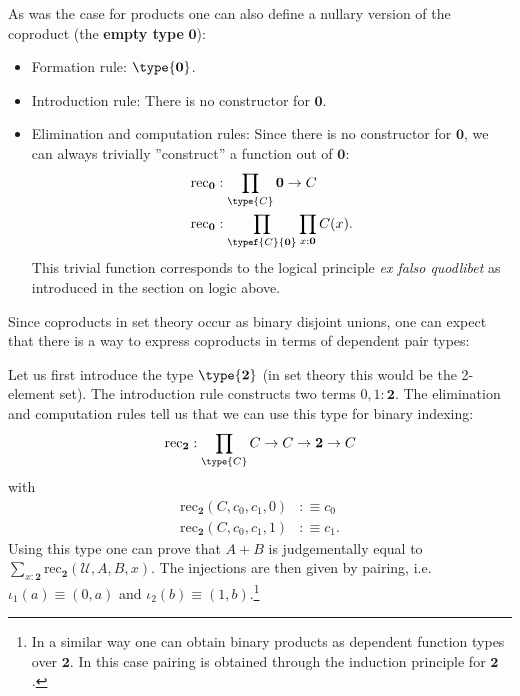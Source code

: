 {        As was the case for products one can also define a nullary version of the coproduct (the \textbf{empty type} $\mathbf{0}$):
        \begin{itemize}
            \item Formation rule: $\type{\mathbf{0}}$.
            \item Introduction rule: There is no constructor for $\mathbf{0}$.
            \item Elimination and computation rules: Since there is no constructor for $\mathbf{0}$, we can always trivially ''construct'' a function out of $\mathbf{0}$:
            \begin{align}
                \text{rec}_{\mathbf{0}}&:\prod_{\type{C}}\mathbf{0}\rightarrow C\\
                \text{rec}_{\mathbf{0}}&:\prod_{\typef{C}{\mathbf{0}}}\prod_{x:\mathbf{0}}C(x).
            \end{align}
            This trivial function corresponds to the logical principle \textit{ex falso quodlibet} as introduced in the section on logic above.
        \end{itemize}
    }

    Since coproducts in set theory occur as binary disjoint unions, one can expect that there is a way to express coproducts in terms of dependent pair types:
    \begin{construct}
        Let us first introduce the type $\type{\mathbf{2}}$ (in set theory this would be the 2-element set). The introduction rule constructs two terms $0,1:\mathbf{2}$. The elimination and computation rules tell us that we can use this type for binary indexing:
        \begin{gather}
            \text{rec}_{\mathbf{2}}:\prod_{\type{C}}C\rightarrow C\rightarrow\mathbf{2}\rightarrow C
        \end{gather}
        with
        \begin{align}
            \text{rec}_{\mathbf{2}}(C, c_0, c_1, 0)&:\equiv c_0\\
            \text{rec}_{\mathbf{2}}(C, c_0, c_1, 1)&:\equiv c_1.
        \end{align}
        Using this type one can prove that $A+B$ is judgementally equal to $\sum_{x:\mathbf{2}}\text{rec}_{\mathbf{2}}(\mathcal{U}, A, B, x)$. The injections are then given by pairing, i.e. $\iota_1(a)\equiv(0, a)$ and $\iota_2(b)\equiv(1, b)$.\footnote{In a similar way one can obtain binary products as dependent function types over $\mathbf{2}$. In this case pairing is obtained through the induction principle for $\mathbf{2}$.}
    \end{construct}

